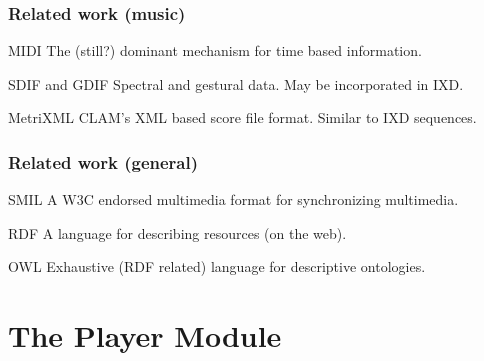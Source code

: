 \documentclass[xcolor=table]{beamer}
\begin{document}
\begin{frame}
  \frametitle{Related work (music)}
  \begin{block}{MIDI}
    The (still?) dominant mechanism for time based information.
  \end{block}
  \begin{block}{SDIF and GDIF}
    Spectral and gestural data. May be incorporated in IXD.
  \end{block}
  \begin{block}{MetriXML}
    CLAM's XML based score file format. Similar to IXD sequences.
  \end{block}
\end{frame}

\begin{frame}
  \frametitle{Related work (general)}
  \begin{block}{SMIL}
    A W3C endorsed multimedia format for synchronizing multimedia.
  \end{block}
  \begin{block}{RDF}
    A language for describing resources (on the web).
  \end{block}
  \begin{block}{OWL}
    Exhaustive (RDF related) language for descriptive ontologies.
  \end{block}
\end{frame}

\section{The Player Module}
\end{document}
